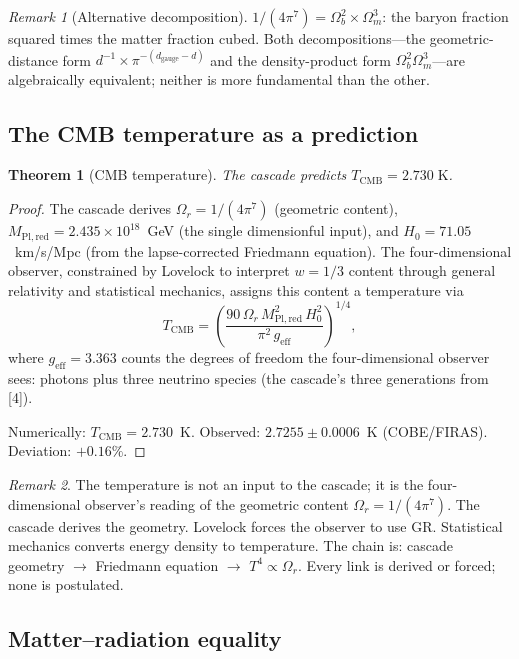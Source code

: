 \documentclass[12pt,a4paper]{article}
\newtheorem{theorem}{Theorem}[section]
\theoremstyle{remark}
\newtheorem*{remark}{Remark}
\begin{document}
\begin{remark}[Alternative decomposition]
$1/(4\pi^7) = \Omega_b^2 \times \Omega_m^3$: the baryon fraction squared times the matter fraction cubed. Both decompositions---the geometric-distance form $d^{-1} \times \pi^{-(d_{\mathrm{gauge}} - d)}$ and the density-product form $\Omega_b^2 \Omega_m^3$---are algebraically equivalent; neither is more fundamental than the other.
\end{remark}

\subsection{The CMB temperature as a prediction}

\begin{theorem}[CMB temperature]\label{thm:tcmb}
The cascade predicts $T_{\mathrm{CMB}} = 2.730\;\mathrm{K}$.
\end{theorem}

\begin{proof}
The cascade derives $\Omega_r = 1/(4\pi^7)$ (geometric content), $M_{\mathrm{Pl,red}} = 2.435 \times 10^{18}$~GeV (the single dimensionful input), and $H_0 = 71.05$~km/s/Mpc (from the lapse-corrected Friedmann equation). The four-dimensional observer, constrained by Lovelock to interpret $w = 1/3$ content through general relativity and statistical mechanics, assigns this content a temperature via
\[
T_{\mathrm{CMB}} = \left(\frac{90\, \Omega_r\, M_{\mathrm{Pl,red}}^2\, H_0^2}{\pi^2\, g_{\mathrm{eff}}}\right)^{1/4},
\]
where $g_{\mathrm{eff}} = 3.363$ counts the degrees of freedom the four-dimensional observer sees: photons plus three neutrino species (the cascade's three generations from [4]).

Numerically: $T_{\mathrm{CMB}} = 2.730$~K. Observed: $2.7255 \pm 0.0006$~K (COBE/FIRAS). Deviation: $+0.16\%$.
\end{proof}

\begin{remark}
The temperature is not an input to the cascade; it is the four-dimensional observer's reading of the geometric content $\Omega_r = 1/(4\pi^7)$. The cascade derives the geometry. Lovelock forces the observer to use GR. Statistical mechanics converts energy density to temperature. The chain is: cascade geometry $\to$ Friedmann equation $\to$ $T^4 \propto \Omega_r$. Every link is derived or forced; none is postulated.
\end{remark}

\subsection{Matter--radiation equality}
\end{document}
